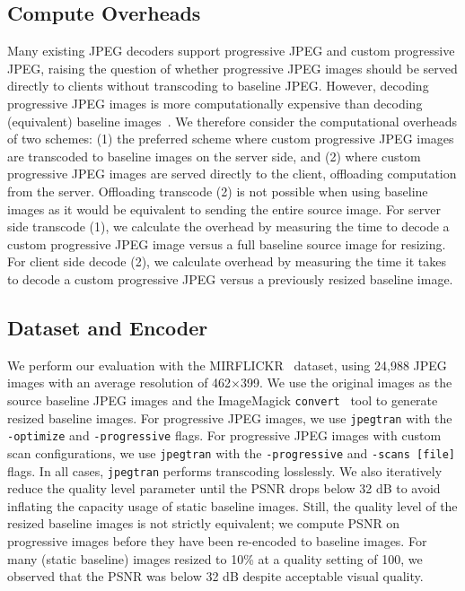 \subsection{Compute Overheads}
Many existing JPEG decoders support progressive JPEG and custom progressive JPEG, raising the question of whether progressive JPEG images should be served directly to clients without transcoding to baseline JPEG\@.
However, decoding progressive JPEG images is more computationally expensive than decoding (equivalent) baseline images~\cite{computation}.
We therefore consider the computational overheads of two schemes: (1) the preferred scheme where custom progressive JPEG images are transcoded to baseline images on the server side, and (2) where custom progressive JPEG images are served directly to the client, offloading computation from the server.
Offloading transcode (2) is not possible when using baseline images as it would be equivalent to sending the entire source image.
For server side transcode (1), we calculate the overhead by measuring the time to decode a custom progressive JPEG image versus a full baseline source image for resizing. 
For client side decode (2), we calculate overhead by measuring the time it takes to decode a custom progressive JPEG versus a previously resized baseline image.

\subsection{Dataset and Encoder}
We perform our evaluation with the MIRFLICKR~\cite{huiskes08} dataset, using 24,988 JPEG images with an average resolution of 462$\times$399.
We use the original images as the source baseline JPEG images and the ImageMagick \texttt{convert}~\cite{imagemagick2008imagemagick} tool to generate resized baseline images. %
For progressive JPEG images, we use \texttt{jpegtran} with the \texttt{-optimize} and \texttt{-progressive} flags. 
For progressive JPEG images with custom scan configurations, we use \texttt{jpegtran} with the \texttt{-progressive} and \texttt{-scans [file]} flags.
In all cases, \texttt{jpegtran} performs transcoding losslessly.
We also iteratively reduce the quality level parameter until the PSNR drops below 32 dB to avoid inflating the capacity usage of static baseline images. 
Still, the quality level of the resized baseline images is not strictly equivalent; we compute PSNR on progressive images before they have been re-encoded to baseline images.
For many (static baseline) images resized to 10\% at a quality setting of 100, we observed that the PSNR was below 32 dB despite acceptable visual quality. 
